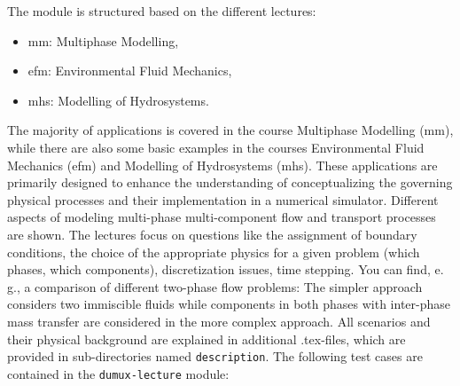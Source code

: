 The module is structured based on the different lectures:
\begin{itemize}
\item mm: Multiphase Modelling,
\item efm: Environmental Fluid Mechanics,
\item mhs: Modelling of Hydrosystems.
\end{itemize}
The majority of applications is covered in the course Multiphase Modelling (mm),
while there are also some basic examples in the
courses Environmental Fluid Mechanics (efm) and Modelling of Hydrosystems (mhs).
These applications are primarily designed to enhance the understanding of conceptualizing the
governing physical processes and their implementation in a numerical simulator.
Different aspects of modeling multi-phase multi-component flow and transport processes are shown.
The lectures focus on questions like the assignment of boundary conditions, the choice of the
appropriate physics for a given problem (which phases, which components), discretization issues,
time stepping. You can find, e. g., a comparison of different two-phase flow problems: The
simpler approach considers two immiscible fluids while components in both phases with inter-phase
mass transfer are considered in the more complex approach.
All scenarios and their physical background are explained in additional .tex-files,
which are provided in sub-directories named \texttt{description}. The following test cases are
contained in the \texttt{dumux-lecture} module:
